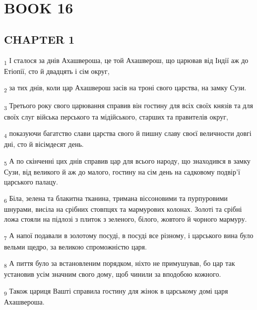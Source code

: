 \section{BOOK 16}
\subsection{CHAPTER 1}
\begin{tcolorbox}
\textsubscript{1} І сталося за днів Ахашвероша, це той Ахашверош, що царював від Індії аж до Етіопії, сто й двадцять і сім округ,
\end{tcolorbox}
\begin{tcolorbox}
\textsubscript{2} за тих днів, коли цар Ахашверош засів на троні свого царства, на замку Сузи.
\end{tcolorbox}
\begin{tcolorbox}
\textsubscript{3} Третього року свого царювання справив він гостину для всіх своїх князів та для своїх слуг війська перського та мідійського, старших та правителів округ,
\end{tcolorbox}
\begin{tcolorbox}
\textsubscript{4} показуючи багатство слави царства свого й пишну славу своєї величности довгі дні, сто й вісімдесят день.
\end{tcolorbox}
\begin{tcolorbox}
\textsubscript{5} А по скінченні цих днів справив цар для всього народу, що знаходився в замку Сузи, від великого й аж до малого, гостину на сім день на садковому подвір'ї царського палацу.
\end{tcolorbox}
\begin{tcolorbox}
\textsubscript{6} Біла, зелена та блакитна тканина, тримана віссоновими та пурпуровими шнурами, висіла на срібних стовпцях та мармурових колонах. Золоті та срібні ложа стояли на підлозі з плиток з зеленого, білого, жовтого й чорного мармуру.
\end{tcolorbox}
\begin{tcolorbox}
\textsubscript{7} А напої подавали в золотому посуді, в посуді все різному, і царського вина було вельми щедро, за великою спроможністю царя.
\end{tcolorbox}
\begin{tcolorbox}
\textsubscript{8} А пиття було за встановленим порядком, ніхто не примушував, бо цар так установив усім значним свого дому, щоб чинили за вподобою кожного.
\end{tcolorbox}
\begin{tcolorbox}
\textsubscript{9} Також цариця Вашті справила гостину для жінок в царському домі царя Ахашвероша.
\end{tcolorbox}
